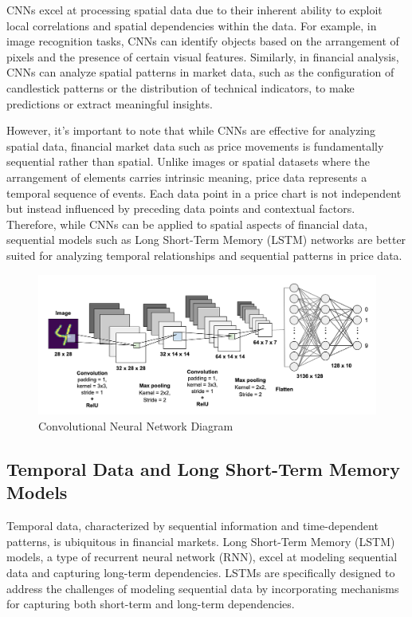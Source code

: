 \documentclass{article}
\begin{document}
CNNs excel at processing spatial data due to their inherent ability to exploit local correlations and spatial dependencies within the data. For example, in image recognition tasks, CNNs can identify objects based on the arrangement of pixels and the presence of certain visual features. Similarly, in financial analysis, CNNs can analyze spatial patterns in market data, such as the configuration of candlestick patterns or the distribution of technical indicators, to make predictions or extract meaningful insights.

However, it's important to note that while CNNs are effective for analyzing spatial data, financial market data such as price movements is fundamentally sequential rather than spatial. Unlike images or spatial datasets where the arrangement of elements carries intrinsic meaning, price data represents a temporal sequence of events. Each data point in a price chart is not independent but instead influenced by preceding data points and contextual factors. Therefore, while CNNs can be applied to spatial aspects of financial data, sequential models such as Long Short-Term Memory (LSTM) networks are better suited for analyzing temporal relationships and sequential patterns in price data.

\begin{figure}[ht]
	\centering
	\includegraphics[width=0.7\linewidth]{visuals/cnn_model}
	\caption{Convolutional Neural Network Diagram}
	\label{fig:cnnmodel}
\end{figure}


\subsection{Temporal Data and Long Short-Term Memory Models}
Temporal data, characterized by sequential information and time-dependent patterns, is ubiquitous in financial markets. Long Short-Term Memory (LSTM) models, a type of recurrent neural network (RNN), excel at modeling sequential data and capturing long-term dependencies. LSTMs are specifically designed to address the challenges of modeling sequential data by incorporating mechanisms for capturing both short-term and long-term dependencies. 
\end{document}
